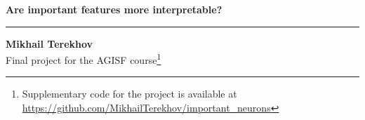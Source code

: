 \documentclass[12pt]{article}
\begin{document}
\begin{center}
  {\LARGE \bf{Are important features more interpretable?}}
\end{center}
\vspace{-1em}

\noindent\rule{\textwidth}{1pt}

  
\begin{center}
  {\large \bf{Mikhail Terekhov}} \\
  Final project for the AGISF course\footnote{Supplementary code for the project is available at \url{https://github.com/MikhailTerekhov/important_neurons}}
\end{center}

\end{document}
